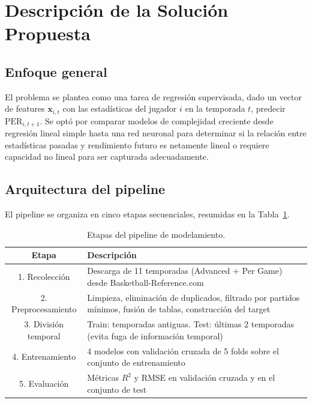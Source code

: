 \documentclass[11pt,a4paper]{article}
\begin{document}
\section{Descripción de la Solución Propuesta}

\subsection{Enfoque general}

El problema se plantea como una tarea de regresión supervisada, dado
un vector de features $\mathbf{x}_{i,t}$ con las estadísticas del jugador $i$
en la temporada $t$, predecir $\text{PER}_{i,t+1}$. Se optó por comparar
modelos de complejidad creciente desde regresión lineal simple hasta una red
neuronal para determinar si la relación entre estadísticas pasadas y
rendimiento futuro es netamente lineal o requiere capacidad no lineal
para ser capturada adecuadamente.

\subsection{Arquitectura del pipeline}

El pipeline se organiza en cinco etapas secuenciales, resumidas en la
Tabla~\ref{tab:pipeline}.

\begin{table}[H]
\centering
\renewcommand{\arraystretch}{1.3}
\begin{tabular}{|c|p{11cm}|}
\hline
\textbf{Etapa} & \textbf{Descripción} \\
\hline
1. Recolección & Descarga de 11 temporadas (Advanced + Per Game) desde
Basketball-Reference.com \\
\hline
2. Preprocesamiento & Limpieza, eliminación de duplicados, filtrado por
partidos mínimos, fusión de tablas, construcción del target \\
\hline
3. División temporal & Train: temporadas antiguas. Test: últimas 2
temporadas (evita fuga de información temporal) \\
\hline
4. Entrenamiento & 4 modelos con validación cruzada de 5 folds sobre el
conjunto de entrenamiento \\
\hline
5. Evaluación & Métricas $R^2$ y RMSE en validación cruzada y en el
conjunto de test \\
\hline
\end{tabular}
\caption{Etapas del pipeline de modelamiento.}
\label{tab:pipeline}
\end{table}
\end{document}
